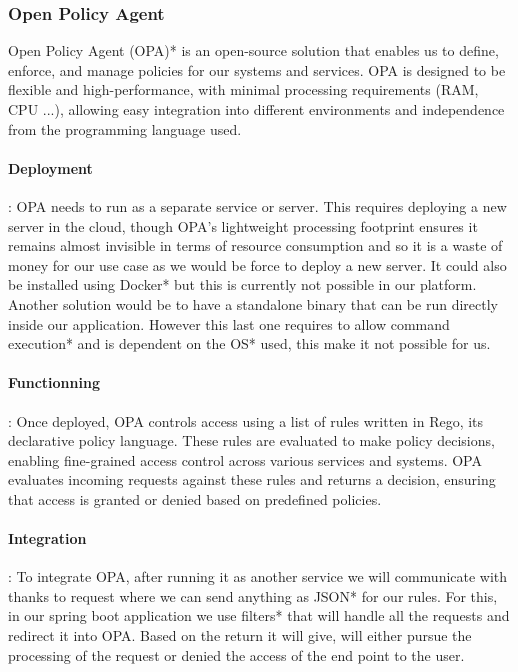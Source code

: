 \documentclass[12pt,a4paper,table,english]{article}
\begin{document}
	
	\subsubsection{Open Policy Agent}
	
	Open Policy Agent (OPA)*\citep{OPA} is an open-source solution that enables us to define, enforce, and manage policies for our systems and services. OPA is designed to be flexible and high-performance, with minimal processing requirements (RAM, CPU ...), allowing easy integration into different environments and independence from the programming language used. 
	
	
	\paragraph{Deployment}: OPA needs to run as a separate service or server. This requires deploying a new server in the cloud, though OPA's lightweight processing footprint ensures it remains almost invisible in terms of resource consumption and so it is a waste of money for our use case as we would be force to deploy a new server. It could also be installed using Docker* but this is currently not possible in our platform. Another solution would be to have a standalone binary that can be run directly inside our application. However this last one requires to allow command execution* and is dependent on the OS* used, this make it not possible for us. 
	
	\pagebreak
	
	\paragraph{Functionning}: Once deployed, OPA controls access using a list of rules written in Rego, its declarative policy language. These rules are evaluated to make policy decisions, enabling fine-grained access control across various services and systems. OPA evaluates incoming requests against these rules and returns a decision, ensuring that access is granted or denied based on predefined policies. 
	
	
	\paragraph{Integration}: To integrate OPA, after running it as another service we will communicate with thanks to request where we can send anything as JSON* for our rules. For this, in our spring boot application we use filters* that will handle all the requests and redirect it into OPA. Based on the return it will give, will either pursue the processing of the request or denied the access of the end point to the user. 
	
\end{document}
